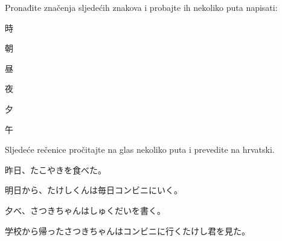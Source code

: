 
\author{Ivan Petranović}

	
	\begin{mondai}{Pronađite značenja sljedećih znakova i probajte ih nekoliko puta napisati:}
		\item 時
		\item 朝
		\item 昼
		\item 夜
		\item 夕
		\item 午\footnotemark[1]
	\end{mondai}


	\begin{mondai}{Sljedeće rečenice pročitajte na glas nekoliko puta i prevedite na hrvatski.}
		\item 昨日、たこやきを食べた。
		\item 明日から、たけしくんは毎日コンビニにいく。
		\item 夕べ、さつきちゃんはしゅくだいを書く。
		\item *学校から帰ったさつきちゃんはコンビニに行くたけし君を見た。
	\end{mondai}

